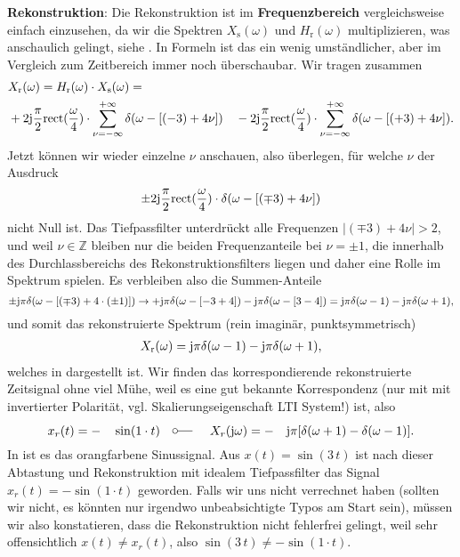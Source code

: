 \begin{Loesung}
\textbf{Rekonstruktion}:
Die Rekonstruktion ist im \textbf{Frequenzbereich} vergleichsweise einfach einzusehen,
da wir die Spektren $X_\mathrm{s}(\omega)$ und $H_\mathrm{r}(\omega)$
multiplizieren, was anschaulich gelingt, siehe
.
In Formeln ist das ein wenig umständlicher, aber im Vergleich zum Zeitbereich immer
noch überschaubar. Wir tragen zusammen
\begin{align}
&X_\mathrm{r}(\omega) =
H_\mathrm{r}(\omega) \cdot X_\mathrm{s}(\omega) =\\
&+2\im
\frac{\pi}{2}\mathrm{rect}(\frac{\omega}{4}) \cdot \sum_{\nu=-\infty}^{+\infty} \delta(\omega - [(-3)+4\nu])
\quad-
2\im
\frac{\pi}{2}\mathrm{rect}(\frac{\omega}{4}) \cdot \sum_{\nu=-\infty}^{+\infty} \delta(\omega - [(+3)+4\nu]).
\end{align}
%
Jetzt können wir wieder einzelne $\nu$ anschauen, also überlegen, für welche $\nu$
der Ausdruck
\begin{equation}
\pm 2\im \frac{\pi}{2}\mathrm{rect}(\frac{\omega}{4}) \cdot \delta(\omega - [(\mp 3)+4\nu])
\end{equation}
nicht Null ist. Das Tiefpassfilter unterdrückt alle Frequenzen $|(\mp 3)+4\nu|>2$,
und weil $\nu\in\mathbb{Z}$ bleiben nur die beiden Frequenzanteile bei $\nu=\pm 1$,
die innerhalb des Durchlassbereichs des Rekonstruktionsfilters liegen
und daher eine Rolle im Spektrum spielen. Es verbleiben also die Summen-Anteile
\begin{equation}
\pm \im \pi  \delta(\omega - [(\mp 3)+4 \cdot (\pm 1)]) \rightarrow
+ \im \pi  \delta(\omega - [-3+4]) - \im \pi  \delta(\omega - [3-4])=
\im \pi  \delta(\omega - 1) - \im \pi  \delta(\omega + 1),
\end{equation}
und somit das rekonstruierte Spektrum (rein imaginär, punktsymmetrisch)
\begin{align}
X_\mathrm{r}(\omega) = \im \pi  \delta(\omega - 1) - \im \pi  \delta(\omega + 1),
\end{align}
welches in  dargestellt ist.
Wir finden das korrespondierende rekonstruierte Zeitsignal ohne viel Mühe, weil
es eine gut bekannte Korrespondenz (nur mit mit invertierter Polarität, vgl.
Skalierungseigenschaft LTI System!) ist, also
\begin{equation}
x_r(t) = -\quad\sin(1\cdot t) \quad\fourier\quad X_r(\mathrm{j} \omega) =
 -\quad\mathrm{j} \pi [\delta(\omega+1) - \delta(\omega-1)].
\end{equation}
In  ist es das orangfarbene Sinussignal.
Aus $x(t)=\sin(3\,t)$ ist nach dieser Abtastung und Rekonstruktion mit idealem
Tiefpassfilter das Signal $x_r(t) = -\sin(1\cdot t)$ geworden. Falls wir uns nicht verrechnet
haben (sollten wir nicht, es könnten nur irgendwo unbeabsichtigte Typos am Start sein),
müssen wir also konstatieren, dass die Rekonstruktion nicht fehlerfrei gelingt,
weil sehr offensichtlich $x(t) \neq x_r(t)$, also $\sin(3\,t) \neq -\sin(1\cdot t)$.


\end{Loesung}
